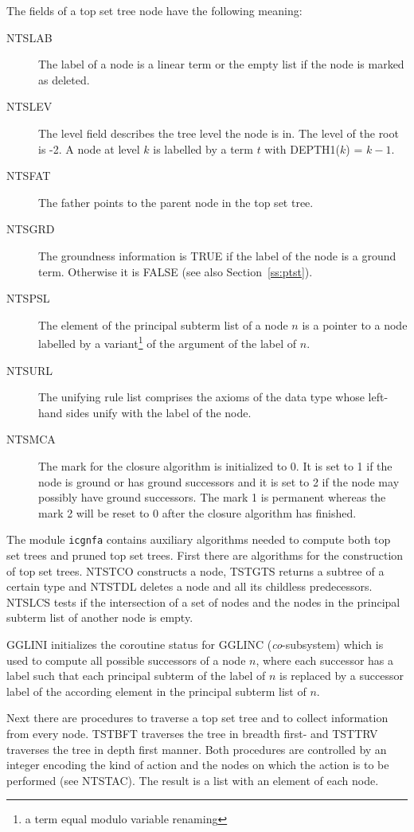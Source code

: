 The fields of a top set tree node have the following meaning:
\begin{description}
 \item[NTSLAB] The label of a node is a linear term or the empty list if the 
   node is marked as deleted.
 \item[NTSLEV] The level field describes the tree level the node is in.
   The level of the root is -2. 
   A node at level $k$ is labelled by a term $t$ with DEPTH1($k$) = $k-1$.
 \item[NTSFAT] The father points to the parent node in the top set tree.
 \item[NTSGRD] The groundness information is TRUE if the label of the node
   is a ground term. Otherwise it is FALSE (see also Section~\ref{ss:ptst}).
 \item[NTSPSL] The  element of the principal subterm list of a node
   $n$ is a pointer to a node labelled by a variant\footnote{a term equal modulo
   variable renaming} of the  argument of the label of $n$.
 \item[NTSURL] The unifying rule list comprises the axioms of the data type
   whose left-hand sides unify with the label of the node.
 \item[NTSMCA] The mark for the closure algorithm is initialized to 0.
   It is set to 1 if the node is ground or has ground successors and it is
   set to 2 if the node may possibly have ground successors. The mark 1 is 
   permanent whereas the mark 2 will be reset to 0 after the closure algorithm
   has finished.
\end{description}

The module {\tt icgnfa} contains auxiliary algorithms needed to compute 
both top set trees and pruned top set trees.
First there are algorithms for the construction of top set trees.
NTSTCO constructs a node, TSTGTS returns a subtree of a certain
type and NTSTDL deletes a node and all its childless predecessors.
NTSLCS tests if the intersection of a set of nodes and the nodes in the
principal subterm list of another node is empty.

GGLINI initializes the coroutine status for GGLINC ({\it co}-subsystem)
which is used to compute all possible successors of a node $n$,
where each successor has a label such that each principal subterm of
the label of $n$ is replaced by a successor label of the according element
in the principal subterm list of $n$.

Next there are procedures to traverse a top set tree and to collect information
from every node.
TSTBFT traverses the tree in breadth first- and TSTTRV traverses the tree 
in depth first manner.
Both procedures are controlled by an integer encoding the kind of action and
the nodes on which the action is to be performed (see NTSTAC).
The result is a list with an element of each node.

